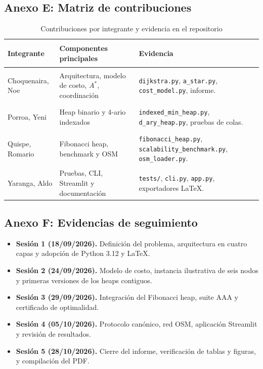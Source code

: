 \subsection*{Anexo E: Matriz de contribuciones}
\label{anexo:contribuciones}
\begin{table}[H]
    \centering
    \fontsize{9}{11}\selectfont
    \renewcommand{\arraystretch}{1.15}
    \caption{Contribuciones por integrante y evidencia en el repositorio}
    \label{tab:contribuciones}
    \begin{tabularx}{\textwidth}{@{}>{\bfseries\raggedright\arraybackslash}p{2.8cm} >{\raggedright\arraybackslash}p{5.0cm} >{\raggedright\arraybackslash}X@{}}
        \toprule
        \textbf{Integrante} & \textbf{Componentes principales} & \textbf{Evidencia} \\
        \midrule
        Choquenaira, Noe & Arquitectura, modelo de costo, $A^*$, coordinación & \texttt{dijkstra.py}, \texttt{a\_star.py}, \texttt{cost\_model.py}, informe. \\
        Porroa, Yeni & Heap binario y 4-ario indexados & \texttt{indexed\_min\_heap.py}, \texttt{d\_ary\_heap.py}, pruebas de colas. \\
        Quispe, Romario & Fibonacci heap, benchmark y OSM & \texttt{fibonacci\_heap.py}, \texttt{scalability\_benchmark.py}, \texttt{osm\_loader.py}. \\
        Yaranga, Aldo & Pruebas, CLI, Streamlit y documentación & \texttt{tests/}, \texttt{cli.py}, \texttt{app.py}, exportadores LaTeX. \\
        \bottomrule
    \end{tabularx}
\end{table}

\subsection*{Anexo F: Evidencias de seguimiento}
\label{anexo:seguimiento}
\begin{itemize}
    \item \textbf{Sesión 1 (18/09/2026).} Definición del problema, arquitectura en cuatro capas y adopción de Python 3.12 y LaTeX.
    \item \textbf{Sesión 2 (24/09/2026).} Modelo de costo, instancia ilustrativa de seis nodos y primeras versiones de los heaps contiguos.
    \item \textbf{Sesión 3 (29/09/2026).} Integración del Fibonacci heap, suite AAA y certificado de optimalidad.
    \item \textbf{Sesión 4 (05/10/2026).} Protocolo canónico, red OSM, aplicación Streamlit y revisión de resultados.
    \item \textbf{Sesión 5 (28/10/2026).} Cierre del informe, verificación de tablas y figuras, y compilación del PDF.
\end{itemize}
